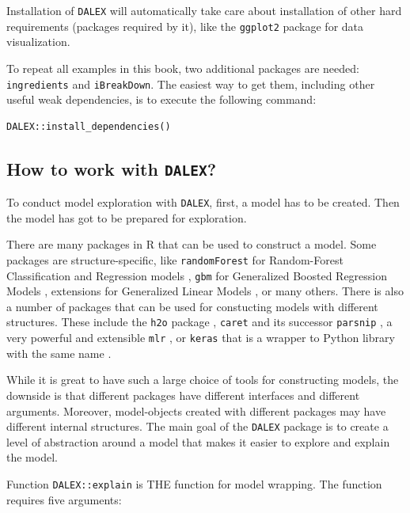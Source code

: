 \documentclass[12pt,]{krantz}
\begin{document}
Installation of \texttt{DALEX} will automatically take care about installation of other hard requirements (packages required by it), like the \texttt{ggplot2} package for data visualization.

To repeat all examples in this book, two additional packages are needed: \texttt{ingredients} and \texttt{iBreakDown}. The easiest way to get them, including other useful weak dependencies, is to execute the following command:

\begin{verbatim}
DALEX::install_dependencies()
\end{verbatim}

\hypertarget{how-to-work-with-dalex}{%
\subsection{\texorpdfstring{How to work with \texttt{DALEX}?}{How to work with DALEX?}}\label{how-to-work-with-dalex}}

To conduct model exploration with \texttt{DALEX}, first, a model has to be created. Then the model has got to be prepared for exploration.

There are many packages in R that can be used to construct a model. Some packages are structure-specific, like \texttt{randomForest} for Random-Forest Classification and Regression models \citep{randomForest}, \texttt{gbm} for Generalized Boosted Regression Models \citep{gbm}, extensions for Generalized Linear Models \citep{rms}, or many others. There is also a number of packages that can be used for constucting models with different structures. These include the \texttt{h2o} package \citep{h2oPackage}, \texttt{caret} \citep{caret} and its successor \texttt{parsnip} \citep{parsnipPackage}, a very powerful and extensible \texttt{mlr} \citep{mlr}, or \texttt{keras} that is a wrapper to Python library with the same name \citep{kerasPackage}.

While it is great to have such a large choice of tools for constructing models, the downside is that different packages have different interfaces and different arguments. Moreover, model-objects created with different packages may have different internal structures. The main goal of the \texttt{DALEX} package \citep{DALEX} is to create a level of abstraction around a model that makes it easier to explore and explain the model.

Function \texttt{DALEX::explain} is THE function for model wrapping. The function requires five arguments:
\end{document}
